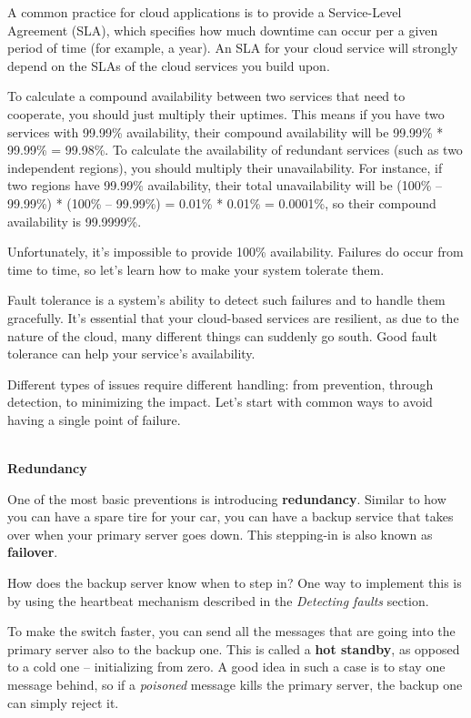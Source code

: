 A common practice for cloud applications is to provide a Service-Level Agreement (SLA), which specifies how much downtime can occur per a given period of time (for example, a year). An SLA for your cloud service will strongly depend on the SLAs of the cloud services you build upon.

To calculate a compound availability between two services that need to cooperate, you should just multiply their uptimes. This means if you have two services with 99.99\% availability, their compound availability will be 99.99\% * 99.99\% = 99.98\%. To calculate the availability of redundant services (such as two independent regions), you should multiply their unavailability. For instance, if two regions have 99.99\% availability, their total unavailability will be (100\% – 99.99\%) * (100\% – 99.99\%) = 0.01\% * 0.01\% = 0.0001\%, so their compound availability is 99.9999\%.

Unfortunately, it's impossible to provide 100\% availability. Failures do occur from time to time, so let's learn how to make your system tolerate them.


Fault tolerance is a system's ability to detect such failures and to handle them gracefully. It's essential that your cloud-based services are resilient, as due to the nature of the cloud, many different things can suddenly go south. Good fault tolerance can help your service's availability.

Different types of issues require different handling: from prevention, through detection, to minimizing the impact. Let's start with common ways to avoid having a single point of failure.

\hspace*{\fill} \\ %
\noindent
\textbf{Redundancy}

One of the most basic preventions is introducing \textbf{redundancy}. Similar to how you can have a spare tire for your car, you can have a backup service that takes over when your primary server goes down. This stepping-in is also known as \textbf{failover}.

How does the backup server know when to step in? One way to implement this is by using the heartbeat mechanism described in the \textit{Detecting faults} section.

To make the switch faster, you can send all the messages that are going into the primary server also to the backup one. This is called a \textbf{hot standby}, as opposed to a cold one – initializing from zero. A good idea in such a case is to stay one message behind, so if a \textit{poisoned} message kills the primary server, the backup one can simply reject it.

